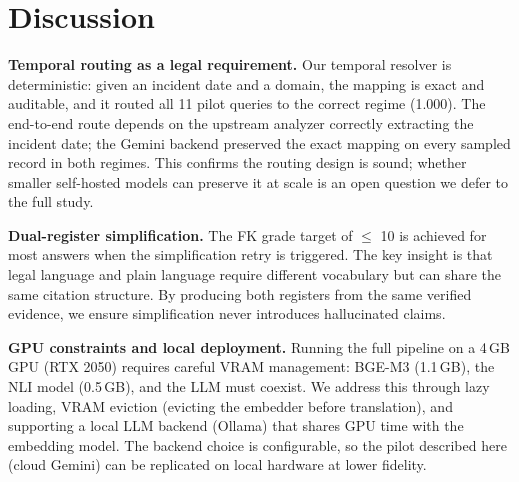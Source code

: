 \documentclass[conference]{IEEEtran}
\begin{document}
\section{Discussion}
\label{sec:discussion}

\textbf{Temporal routing as a legal requirement.} Our temporal resolver is deterministic: given an incident date and a domain, the mapping is exact and auditable, and it routed all 11 pilot queries to the correct regime (1.000). The end-to-end route depends on the upstream analyzer correctly extracting the incident date; the Gemini backend preserved the exact mapping on every sampled record in both regimes. %
This confirms the routing design is sound; whether smaller self-hosted models can preserve it at scale is an open question we defer to the full study.

\textbf{Dual-register simplification.} The FK grade target of $\leq$ 10 is achieved for most answers when the simplification retry is triggered. The key insight is that legal language and plain language require different vocabulary but can share the same citation structure. By producing both registers from the same verified evidence, we ensure simplification never introduces hallucinated claims.

\textbf{GPU constraints and local deployment.} Running the full pipeline on a 4\,GB GPU (RTX 2050) requires careful VRAM management: BGE-M3 (1.1\,GB), the NLI model (0.5\,GB), and the LLM must coexist. We address this through lazy loading, VRAM eviction (evicting the embedder before translation), and supporting a local LLM backend (Ollama) that shares GPU time with the embedding model. The backend choice is configurable, so the pilot described here (cloud Gemini) can be replicated on local hardware at lower fidelity.
\end{document}
